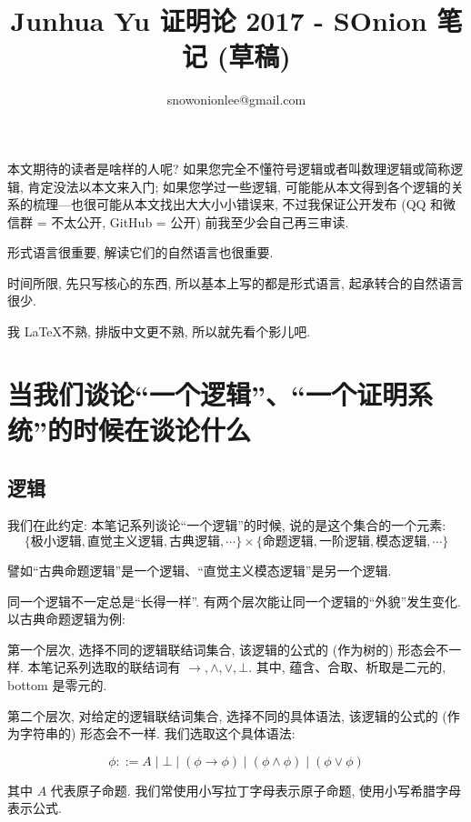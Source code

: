 \documentclass{article}
\title{Junhua Yu 证明论 2017 - SOnion 笔记 (草稿)}
\author{snowonionlee@gmail.com}
\date{\DTMnow}
\begin{document}
\maketitle

本文期待的读者是啥样的人呢? 如果您完全不懂符号逻辑或者叫数理逻辑或简称逻辑, 肯定没法以本文来入门; 如果您学过一些逻辑, 可能能从本文得到各个逻辑的关系的梳理---也很可能从本文找出大大小小错误来, 不过我保证公开发布 (QQ 和微信群 = 不太公开, GitHub = 公开) 前我至少会自己再三审读.

形式语言很重要, 解读它们的自然语言也很重要.

时间所限, 先只写核心的东西, 所以基本上写的都是形式语言, 起承转合的自然语言很少.

我 \LaTeX 不熟, 排版中文更不熟, 所以就先看个影儿吧.

\section{当我们谈论``一个逻辑''、``一个证明系统''的时候在谈论什么}

\subsection{逻辑}

我们在此约定: 本笔记系列谈论``一个逻辑''的时候, 说的是这个集合的一个元素:
$$
\{\text{极小逻辑}, \text{直觉主义逻辑}, \text{古典逻辑}, \cdots\} \times \{\text{命题逻辑}, \text{一阶逻辑}, \text{模态逻辑}, \cdots\}
$$

譬如``古典命题逻辑''是一个逻辑、``直觉主义模态逻辑''是另一个逻辑. 

同一个逻辑不一定总是``长得一样''. 有两个层次能让同一个逻辑的``外貌''发生变化. 以古典命题逻辑为例:

第一个层次, 选择不同的逻辑联结词集合, 该逻辑的公式的 (作为树的) 形态会不一样. 本笔记系列选取的联结词有 $\to,\land,\lor,\bot$. 其中, 蕴含、合取、析取是二元的, bottom 是零元的.

第二个层次, 对给定的逻辑联结词集合, 选择不同的具体语法, 该逻辑的公式的 (作为字符串的) 形态会不一样. 我们选取这个具体语法:

$$
\phi ::= A \mid \bot \mid (\phi \to \phi) \mid (\phi \land \phi) \mid (\phi \lor \phi)
$$ 

其中 $A$ 代表原子命题. 我们常使用小写拉丁字母表示原子命题, 使用小写希腊字母表示公式.
\end{document}
